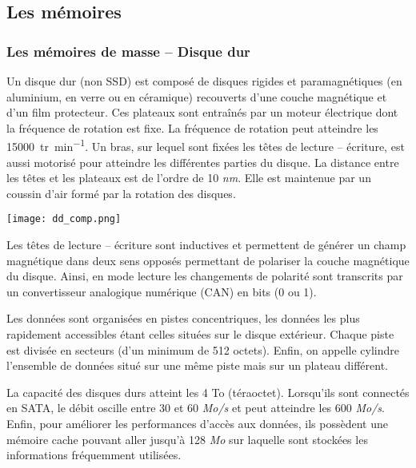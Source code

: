\subsection{Les mémoires}
\subsubsection{Les mémoires de masse -- Disque dur}

\begin{minipage}[c]{.6\linewidth}
Un disque dur (non SSD) est composé de disques rigides et paramagnétiques (en aluminium, en verre ou en céramique) recouverts d'une couche magnétique et d'un film protecteur. Ces plateaux sont entraînés par un moteur électrique dont la fréquence de rotation est fixe. La fréquence de rotation peut atteindre les \SI{15 000}{tr.min^{-1}}. Un bras, sur lequel sont fixées les têtes de lecture -- écriture, est aussi motorisé pour atteindre les différentes parties du disque. La distance entre les têtes et les plateaux est de l'ordre de 10 \textit{nm}. Elle est maintenue par un coussin d'air formé par la rotation des disques. 
\end{minipage} \hfill
\begin{minipage}[c]{.35\linewidth}
\begin{center}
\texttt{[image: dd\_comp.png]}
\end{center}
\end{minipage} 

Les têtes de lecture -- écriture sont inductives et permettent de générer un champ magnétique dans deux sens opposés permettant de polariser la couche magnétique du disque. Ainsi, en mode lecture les changements de polarité sont transcrits par un convertisseur analogique numérique (CAN) en bits (0 ou 1).

Les données sont organisées en pistes concentriques, les données les plus rapidement accessibles étant celles situées sur le disque extérieur. Chaque piste est divisée en secteurs (d'un minimum de 512 octets). Enfin, on appelle cylindre l'ensemble de données situé sur une même piste mais sur un plateau différent. 


La capacité des disques durs atteint les 4 To (téraoctet). Lorsqu'ils sont connectés en SATA, le débit oscille entre 30 et 60 \textit{Mo/s} et peut atteindre les 600 \textit{Mo/s}. Enfin, pour améliorer les performances d'accès aux données, ils possèdent une mémoire cache pouvant aller jusqu'à 128 \textit{Mo} sur laquelle sont stockées les informations fréquemment utilisées. 

